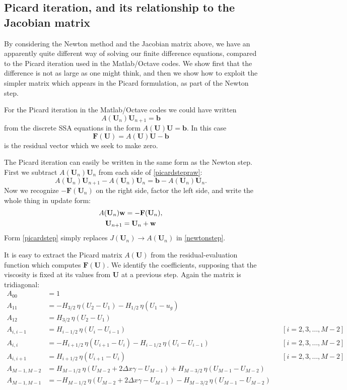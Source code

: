 \documentclass[11pt,final,reqno]{amsart}
\newcommand{\bbF}{\mathbf{F}}
\newcommand{\bU}{\mathbf{U}}
\newcommand{\bb}{\mathbf{b}}
\newcommand{\bw}{\mathbf{w}}
\begin{document}
\subsection*{Picard iteration, and its relationship to the Jacobian matrix} By considering the Newton method and the Jacobian matrix above, we have an apparently quite different way of solving our finite difference equations, compared to the Picard iteration used in the Matlab/Octave codes.  We show first that the difference is not as large as one might think, and then we show how to exploit the simpler matrix which appears in the Picard formulation, as part of the Newton step.

For the Picard iteration in the Matlab/Octave codes we could have written
\begin{equation}
	A(\bU_n) \bU_{n+1} = \bb \label{picardstepraw}
\end{equation}
from the discrete SSA equations in the form $A(\bU) \bU = \bb$.  In this case
	$$\bbF(\bU) = A(\bU) \bU - \bb$$
is the residual vector which we seek to make zero.

The Picard iteration can easily be written in the same form as the Newton step.  First we subtract $A(\bU_n) \bU_n$ from each side of \eqref{picardstepraw}:
	$$A(\bU_n) \bU_{n+1} - A(\bU_n) \bU_n = \bb - A(\bU_n) \bU_n.$$
Now we recognize $-\bbF(\bU_n)$ on the right side, factor the left side, and write the whole thing in update form:
\begin{gather}
A(\bU_n) \bw = - \bbF(\bU_n), \label{picardstep} \\
\bU_{n+1} = \bU_n + \bw \notag
\end{gather}
Form \eqref{picardstep} simply replaces $J(\bU_n) \to A(\bU_n)$ in \eqref{newtonstep}.

It is easy to extract the Picard matrix $A(\bU)$ from the residual-evaluation function which computes $\bbF(\bU)$.  We identify the coefficients, supposing that the viscosity is fixed at its values from $\bU$ at a previous step.  Again the matrix is tridiagonal:
\begin{align*}
A_{00} &= 1 \\
A_{11} &= - H_{3/2}\, \eta(U_2-U_1) - H_{1/2}\, \eta(U_1-u_g) \\
A_{12} &= H_{3/2}\, \eta(U_2-U_1) \\
A_{i,i-1} &= H_{i-1/2}\, \eta(U_i-U_{i-1}) &&[i=2,3,\dots,M-2] \\
A_{i,i} &= - H_{i+1/2}\, \eta(U_{i+1}-U_i) - H_{i-1/2}\, \eta(U_i-U_{i-1}) &&[i=2,3,\dots,M-2] \\
A_{i,i+1} &= H_{i+1/2}\, \eta(U_{i+1}-U_i)  &&[i=2,3,\dots,M-2] \\
A_{M-1,M-2} &= H_{M-1/2}\, \eta(U_{M-2}+2\Delta x \gamma - U_{M-1}) + H_{M-3/2}\, \eta(U_{M-1}-U_{M-2}) \\
A_{M-1,M-1} &= - H_{M-1/2}\, \eta(U_{M-2}+2\Delta x \gamma - U_{M-1}) - H_{M-3/2}\, \eta(U_{M-1}-U_{M-2})
\end{align*}
\end{document}
